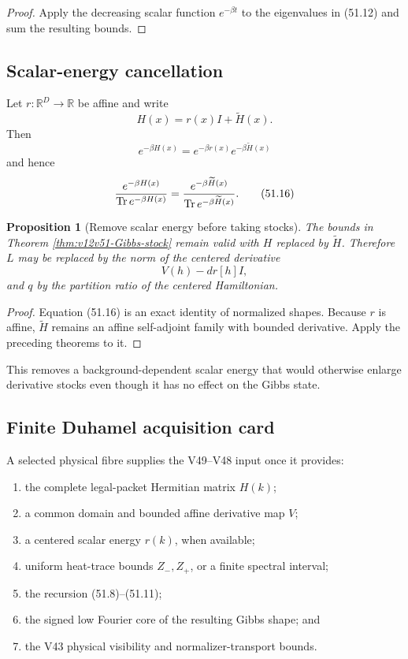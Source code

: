 \documentclass[11pt]{article}
\newtheorem{proposition}[theorem]{Proposition}
\theoremstyle{remark}
\begin{document}
\begin{proof}
Apply the decreasing scalar function \(e^{-\beta t}\) to the
eigenvalues in (51.12) and sum the resulting bounds.
\end{proof}

\subsection{Scalar-energy cancellation}

Let \(r:\mathbb R^D\to\mathbb R\) be affine and write
\begin{equation}
 H(x)=r(x)I+\widetilde H(x).                      \tag{51.15}
\end{equation}
Then
\[
 e^{-\beta H(x)}
 =
 e^{-\beta r(x)}e^{-\beta\widetilde H(x)}
\]
and hence
\begin{equation}
 {e^{-\beta H(x)}\over\operatorname{Tr}e^{-\beta H(x)}}
 =
 {e^{-\beta\widetilde H(x)}
  \over\operatorname{Tr}e^{-\beta\widetilde H(x)}}.        \tag{51.16}
\end{equation}

\begin{proposition}[Remove scalar energy before taking stocks]
\label{prop:v12v51-scalar-energy}
The bounds in Theorem \ref{thm:v12v51-Gibbs-stock} remain valid with
\(H\) replaced by \(\widetilde H\).  Therefore \(L\) may be replaced
by the norm of the centered derivative
\[
 V(h)-dr[h]I,
\]
and \(q\) by the partition ratio of the centered Hamiltonian.
\end{proposition}

\begin{proof}
Equation (51.16) is an exact identity of normalized shapes.
Because \(r\) is affine, \(\widetilde H\) remains an affine
self-adjoint family with bounded derivative.  Apply the preceding
theorems to it.
\end{proof}

This removes a background-dependent scalar energy that would
otherwise enlarge derivative stocks even though it has no effect on
the Gibbs state.

\subsection{Finite Duhamel acquisition card}

A selected physical fibre supplies the V49--V48 input once it
provides:
\begin{enumerate}
\item the complete legal-packet Hermitian matrix \(H(k)\);
\item a common domain and bounded affine derivative map \(V\);
\item a centered scalar energy \(r(k)\), when available;
\item uniform heat-trace bounds \(Z_-,Z_+\), or a finite spectral
interval;
\item the recursion (51.8)--(51.11);
\item the signed low Fourier core of the resulting Gibbs shape; and
\item the V43 physical visibility and normalizer-transport bounds.
\end{enumerate}
\end{document}
